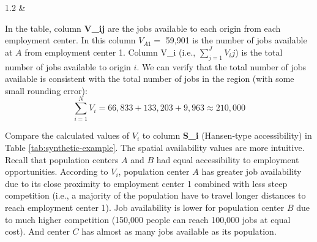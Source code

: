 \documentclass[]{elsarticle} %
\begin{document}
\begin{table}[ht]
\begin{centerbox}
\begin{threeparttable}
\begin{tabularx}{1.2\textwidth}
 &
 \tabularnewline[-0.5pt]


\end{tabularx}
\end{threeparttable}\par\end{centerbox}

\end{table}
 

In the table, column \textbf{V\_ij} are the jobs available to each
origin from each employment center. In this column \(V_{A1}=\) 59,901 is
the number of jobs available at \(A\) from employment center 1. Column
V\_i (i.e., \(\sum_{j=1}^JV_ij\)) is the total number of jobs available
to origin \(i\). We can verify that the total number of jobs available
is consistent with the total number of jobs in the region (with some
small rounding error): \[
\sum_{i=1}^N V_i = 66,833 + 133,203 + 9,963 \approx 210,000 
\]

Compare the calculated values of \(V_i\) to column \textbf{S\_i}
(Hansen-type accessibility) in Table \ref{tab:synthetic-example}. The
spatial availability values are more intuitive. Recall that population
centers \(A\) and \(B\) had equal accessibility to employment
opportunities. According to \(V_i\), population center \(A\) has greater
job availability due to its close proximity to employment center 1
combined with less steep competition (i.e., a majority of the population
have to travel longer distances to reach employment center 1). Job
availability is lower for population center \(B\) due to much higher
competition (150,000 people can reach 100,000 jobs at equal cost). And
center \(C\) has almost as many jobs available as its population.
\end{document}
